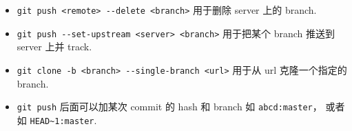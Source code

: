 \begin{itemize}
\item \verb|git push <remote> --delete <branch>| 用于删除 server 上的 branch.
\item \verb|git push --set-upstream <server> <branch>| 用于把某个 branch 推送到 server 上并 track.


\item \verb|git clone -b <branch> --single-branch <url>| 用于从 url 克隆一个指定的 branch.
\item \verb|git push| 后面可以加某次 commit 的 hash 和 branch 如 \verb|abcd:master|， 或者如 \verb|HEAD~1:master|.
\end{itemize}
